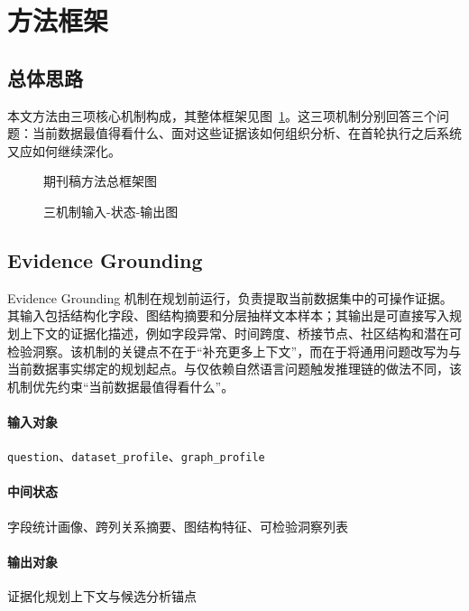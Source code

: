 \section{方法框架}

\subsection{总体思路}

本文方法由三项核心机制构成，其整体框架见图~\ref{fig:framework}。这三项机制分别回答三个问题：当前数据最值得看什么、面对这些证据该如何组织分析、在首轮执行之后系统又应如何继续深化。

\begin{figure}[H]
\centering
{}
\caption{期刊稿方法总框架图}
\label{fig:framework}
\end{figure}

\begin{figure}[H]
\centering
{}
\caption{三机制输入-状态-输出图}
\label{fig:three-mechanisms}
\end{figure}

\subsection{Evidence Grounding}

Evidence Grounding 机制在规划前运行，负责提取当前数据集中的可操作证据。其输入包括结构化字段、图结构摘要和分层抽样文本样本；其输出是可直接写入规划上下文的证据化描述，例如字段异常、时间跨度、桥接节点、社区结构和潜在可检验洞察。该机制的关键点不在于“补充更多上下文”，而在于将通用问题改写为与当前数据事实绑定的规划起点。与仅依赖自然语言问题触发推理链的做法不同\citep{wei2022chain,yao2023react}，该机制优先约束“当前数据最值得看什么”。

\paragraph{输入对象}
\texttt{question}、\texttt{dataset\_profile}、\texttt{graph\_profile}

\paragraph{中间状态}
字段统计画像、跨列关系摘要、图结构特征、可检验洞察列表

\paragraph{输出对象}
证据化规划上下文与候选分析锚点

